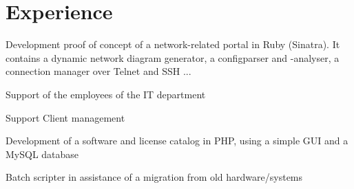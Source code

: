 \documentclass[a4paper]{deedy-resume} %
\begin{document}
\hfill
%
%
\begin{minipage}[t]{0.60\textwidth} %


\section{Experience}


\vspace{\topsep} %
\begin{tightitemize}
\item Development proof of concept of a network-related portal in Ruby (Sinatra). It contains a dynamic network diagram generator, a configparser and -analyser, a connection manager over Telnet and SSH ...
\end{tightitemize}

\sectionspace %



\begin{tightitemize}
\item Support of the employees of the IT department
\item Support Client management
\item Development of a software and license catalog in PHP, using a simple GUI and a MySQL database
\item Batch scripter in assistance of a migration from old hardware/systems
\end{tightitemize}

\sectionspace %




\end{minipage}
\end{document}
